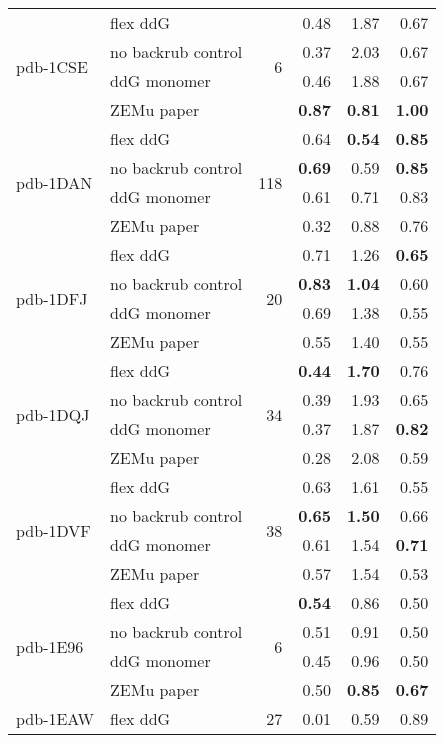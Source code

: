 {\begin{longtable}{llrrrr}
\hline
 \multirow{ 4}{*}{pdb-1CSE} & flex ddG & \multirow{ 4}{*}{6} & 0.48 & 1.87 & 0.67  \\
 & no backrub control & & 0.37 & 2.03 & 0.67  \\
 & ddG monomer & & 0.46 & 1.88 & 0.67  \\
 & ZEMu paper & & \textbf{0.87} & \textbf{0.81} & \textbf{1.00}  \\
\hline
 \multirow{ 4}{*}{pdb-1DAN} & flex ddG & \multirow{ 4}{*}{118} & 0.64 & \textbf{0.54} & \textbf{0.85}  \\
 & no backrub control & & \textbf{0.69} & 0.59 & \textbf{0.85}  \\
 & ddG monomer & & 0.61 & 0.71 & 0.83  \\
 & ZEMu paper & & 0.32 & 0.88 & 0.76  \\
\hline
 \multirow{ 4}{*}{pdb-1DFJ} & flex ddG & \multirow{ 4}{*}{20} & 0.71 & 1.26 & \textbf{0.65}  \\
 & no backrub control & & \textbf{0.83} & \textbf{1.04} & 0.60  \\
 & ddG monomer & & 0.69 & 1.38 & 0.55  \\
 & ZEMu paper & & 0.55 & 1.40 & 0.55  \\
\hline
 \multirow{ 4}{*}{pdb-1DQJ} & flex ddG & \multirow{ 4}{*}{34} & \textbf{0.44} & \textbf{1.70} & 0.76  \\
 & no backrub control & & 0.39 & 1.93 & 0.65  \\
 & ddG monomer & & 0.37 & 1.87 & \textbf{0.82}  \\
 & ZEMu paper & & 0.28 & 2.08 & 0.59  \\
\hline
 \multirow{ 4}{*}{pdb-1DVF} & flex ddG & \multirow{ 4}{*}{38} & 0.63 & 1.61 & 0.55  \\
 & no backrub control & & \textbf{0.65} & \textbf{1.50} & 0.66  \\
 & ddG monomer & & 0.61 & 1.54 & \textbf{0.71}  \\
 & ZEMu paper & & 0.57 & 1.54 & 0.53  \\
\hline
 \multirow{ 4}{*}{pdb-1E96} & flex ddG & \multirow{ 4}{*}{6} & \textbf{0.54} & 0.86 & 0.50  \\
 & no backrub control & & 0.51 & 0.91 & 0.50  \\
 & ddG monomer & & 0.45 & 0.96 & 0.50  \\
 & ZEMu paper & & 0.50 & \textbf{0.85} & \textbf{0.67}  \\
\hline
 \multirow{ 4}{*}{pdb-1EAW} & flex ddG & \multirow{ 4}{*}{27} & 0.01 & 0.59 & 0.89  \\

\end{longtable}}
